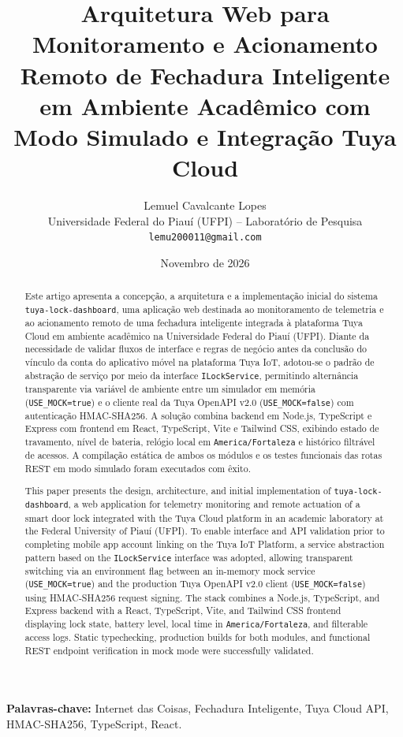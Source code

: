 \documentclass[10pt,twocolumn,a4paper]{article}
\title{\textbf{Arquitetura Web para Monitoramento e Acionamento Remoto de Fechadura Inteligente em Ambiente Acad\^emico com Modo Simulado e Integra\c{c}\~ao Tuya Cloud}}
\author{
  Lemuel Cavalcante Lopes \\
  \small Universidade Federal do Piau\'i (UFPI) -- Laborat\'orio de Pesquisa \\
  \small \texttt{lemu200011@gmail.com}
}
\date{Novembro de 2026}
\begin{document}
\maketitle

\begin{abstract}
Este artigo apresenta a concep\c{c}\~ao, a arquitetura e a implementa\c{c}\~ao inicial do sistema \texttt{tuya-lock-dashboard}, uma aplica\c{c}\~ao web destinada ao monitoramento de telemetria e ao acionamento remoto de uma fechadura inteligente integrada \`a plataforma Tuya Cloud em ambiente acad\^emico na Universidade Federal do Piau\'i (UFPI). Diante da necessidade de validar fluxos de interface e regras de neg\'ocio antes da conclus\~ao do v\'inculo da conta do aplicativo m\'ovel na plataforma Tuya IoT, adotou-se o padr\~ao de abstra\c{c}\~ao de servi\c{c}o por meio da interface \texttt{ILockService}, permitindo altern\^ancia transparente via vari\'avel de ambiente entre um simulador em mem\'oria (\texttt{USE\_MOCK=true}) e o cliente real da Tuya OpenAPI v2.0 (\texttt{USE\_MOCK=false}) com autentica\c{c}\~ao HMAC-SHA256. A solu\c{c}\~ao combina backend em Node.js, TypeScript e Express com frontend em React, TypeScript, Vite e Tailwind CSS, exibindo estado de travamento, n\'ivel de bateria, rel\'ogio local em \texttt{America/Fortaleza} e hist\'orico filtr\'avel de acessos. A compila\c{c}\~ao est\'atica de ambos os m\'odulos e os testes funcionais das rotas REST em modo simulado foram executados com \^exito.
\end{abstract}

\noindent\textbf{Palavras-chave:} Internet das Coisas, Fechadura Inteligente, Tuya Cloud API, HMAC-SHA256, TypeScript, React.

\begin{otherlanguage}{english}
\begin{abstract}
This paper presents the design, architecture, and initial implementation of \texttt{tuya-lock-dashboard}, a web application for telemetry monitoring and remote actuation of a smart door lock integrated with the Tuya Cloud platform in an academic laboratory at the Federal University of Piau\'i (UFPI). To enable interface and API validation prior to completing mobile app account linking on the Tuya IoT Platform, a service abstraction pattern based on the \texttt{ILockService} interface was adopted, allowing transparent switching via an environment flag between an in-memory mock service (\texttt{USE\_MOCK=true}) and the production Tuya OpenAPI v2.0 client (\texttt{USE\_MOCK=false}) using HMAC-SHA256 request signing. The stack combines a Node.js, TypeScript, and Express backend with a React, TypeScript, Vite, and Tailwind CSS frontend displaying lock state, battery level, local time in \texttt{America/Fortaleza}, and filterable access logs. Static typechecking, production builds for both modules, and functional REST endpoint verification in mock mode were successfully validated.
\end{abstract}
\end{otherlanguage}
\end{document}

